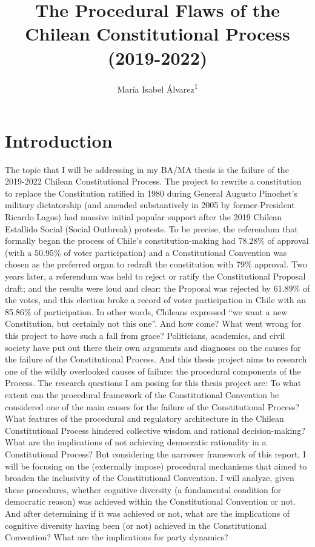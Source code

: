 \documentclass[
  man]{apa6}
\title{The Procedural Flaws of the Chilean Constitutional Process (2019-2022)}
\author{María Isabel Álvarez\textsuperscript{1}}
\date{}
\affiliation{\vspace{0.5cm}\textsuperscript{1} The University of Chicago}
\begin{document}
\maketitle

\hypertarget{introduction}{%
\section{Introduction}\label{introduction}}

The topic that I will be addressing in my BA/MA thesis is the failure of the 2019-2022 Chilean Constitutional Process. The project to rewrite a constitution to replace the Constitution ratified in 1980 during General Augusto Pinochet's military dictatorship (and amended substantively in 2005 by former-President Ricardo Lagos) had massive initial popular support after the 2019 Chilean Estallido Social (Social Outbreak) protests. To be precise, the referendum that formally began the process of Chile's constitution-making had 78.28\% of approval (with a 50.95\% of voter participation) and a Constitutional Convention was chosen as the preferred organ to redraft the constitution with 79\% approval. Two years later, a referendum was held to reject or ratify the Constitutional Proposal draft; and the results were loud and clear: the Proposal was rejected by 61.89\% of the votes, and this election broke a record of voter participation in Chile with an 85.86\% of participation. In other words, Chileans expressed ``we want a new Constitution, but certainly not this one''. And how come? What went wrong for this project to have such a fall from grace? Politicians, academics, and civil society have put out there their own arguments and diagnoses on the causes for the failure of the Constitutional Process. And this thesis project aims to research one of the wildly overlooked causes of failure: the procedural components of the Process.
The research questions I am posing for this thesis project are: To what extent can the procedural framework of the Constitutional Convention be considered one of the main causes for the failure of the Constitutional Process? What features of the procedural and regulatory architecture in the Chilean Constitutional Process hindered collective wisdom and rational decision-making? What are the implications of not achieving democratic rationality in a Constitutional Process? But considering the narrower framework of this report, I will be focusing on the (externally impose) procedural mechanisms that aimed to broaden the inclusivity of the Constitutional Convention. I will analyze, given these procedures, whether cognitive diversity (a fundamental condition for democratic reason) was achieved within the Constitutional Convention or not. And after determining if it was achieved or not, what are the implications of cognitive diversity having been (or not) achieved in the Constitutional Convention? What are the implications for party dynamics?
\end{document}
